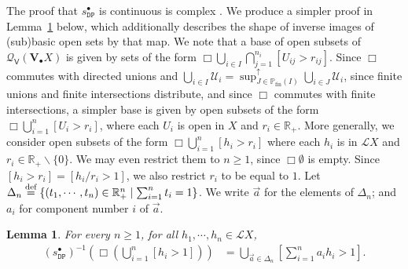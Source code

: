 \documentclass[preprint,12pt]{elsarticle}
\newcommand\eqdef{\mathrel{\buildrel \text{def}\over=}}
\newcommand\pow{\mathbb{P}}
\newcommand\Pfin{\pow_{\mathrm{fin}}}
\newcommand{\Rp}{\mathbb{R}_+}
\newcommand\diff{\smallsetminus}
\newcommand\Lform{\mathcal L}
\newcommand\Demon{{\mathtt{D}}}
\newcommand\Nature{{\mathtt{P}}}
\newcommand\DN{{\Demon\Nature}}
\newcommand\Smyth{{\mathcal Q}}
\newcommand\Vt{\mathsf{V}}
\newcommand\SV{\Smyth_{\Vt}}
\newcommand\Val{{\mathbf V}}
\newcommand\dsup{\sup\nolimits^{\scriptstyle\uparrow}}
\newtheorem{lemma}[theorem]{Lemma}
\begin{document}
The proof that $s_\DN^\bullet$ is continuous is complex
\cite[Lemma~3.20]{JGL-mscs16}.  We produce a simpler proof in
Lemma~\ref{lemma:sDP:inv:func} below, which additionally describes the
shape of inverse images of (sub)basic open sets by that map.  We note
that a base of open subsets of $\SV (\Val_\bullet X)$ is given by sets
of the form
$\Box {\bigcup_{i \in I} \bigcap_{j=1}^{n_i} [U_{ij} > r_{ij}]}$.
Since $\Box$ commutes with directed unions and
$\bigcup_{i \in I} \mathcal U_i = \dsup_{J \in \Pfin (I)} \bigcup_{i
  \in J} \mathcal U_i$, since finite unions and finite intersections
distribute, and since $\Box$ commutes with finite intersections, a
simpler base is given by open subsets of the form
$\Box {\bigcup_{i=1}^n [U_i > r_i]}$, where each $U_i$ is open in $X$
and $r_i \in \Rp$.  More generally, we consider open subsets of the
form $\Box {\bigcup_{i=1}^n [h_i > r_i]}$ where each $h_i$ is in
$\Lform X$ and $r_i \in \Rp \diff \{0\}$.  We may even restrict them
to $n \geq 1$, since $\Box \emptyset$ is empty.  Since
$[h_i > r_i] = [h_i/r_i > 1]$, we also restrict $r_i$ to be equal to
$1$.  Let
$\Delta_n \eqdef \{(t_1, \cdots, t_n) \in \Rp^n \mid \sum_{i=1}^n
t_i=1\}$.  We write $\vec a$ for the elements of $\Delta_n$;
and $a_i$ for component number $i$ of $\vec a$.
\begin{lemma}
  \label{lemma:sDP:inv:func}
  For every $n \geq 1$, for all $h_1, \cdots, h_n \in \Lform X$,
  \begin{align*}
    {(s_\DN^\bullet)}^{-1} (\Box {(\bigcup_{i=1}^n [h_i > 1])})
    & = \bigcup_{\vec a \in \Delta_n} \left[\sum_{i=1}^n a_i h_i >
      1\right].
  \end{align*}
\end{lemma}
\end{document}

